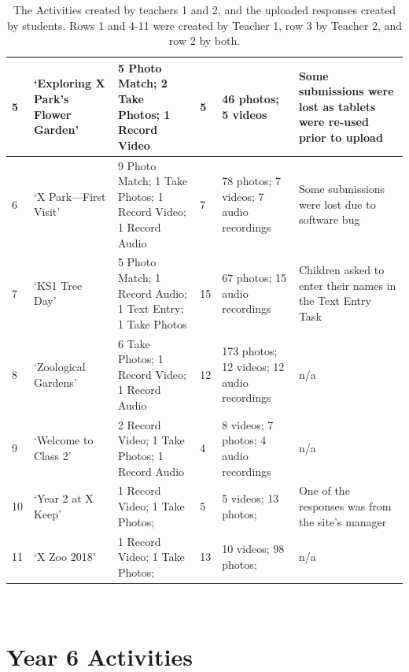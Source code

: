 \begin{table}[]
\begin{tabularx}{\linewidth}{ 
| p{4mm} 
| >{\raggedright\arraybackslash}X 
| >{\raggedright\arraybackslash}X 
| p{13mm}
| >{\raggedright\arraybackslash}X 
| >{\raggedright\arraybackslash}X 
|}
\hline
    \small 5 
    & \footnotesize `Exploring X Park's Flower Garden' 
    & \footnotesize 5 Photo Match; 2 Take Photos; 1 Record Video
    & \footnotesize 5 
    & \footnotesize 46 photos; 5 videos
    & \footnotesize Some submissions were lost as tablets were re-used prior to upload\\
\hline
    \small 6 
    & \footnotesize `X Park---First Visit' 
    & \footnotesize 9 Photo Match; 1 Take Photos; 1 Record Video; 1 Record Audio
    & \footnotesize 7 
    & \footnotesize 78 photos; 7 videos; 7 audio recordings
    & \footnotesize Some submissions were lost due to software bug\\
\hline
    \small 7 
    & \footnotesize `KS1 Tree Day' 
    & \footnotesize 5 Photo Match; 1 Record Audio; 1 Text Entry; 1 Take Photos
    & \footnotesize 15 
    & \footnotesize 67 photos; 15 audio recordings
    & \footnotesize Children asked to enter their names in the Text Entry Task\\
\hline
    \small 8 
    & \footnotesize `Zoological Gardens' 
    & \footnotesize 6 Take Photos; 1 Record Video; 1 Record Audio
    & \footnotesize 12 
    & \footnotesize 173 photos; 12 videos; 12 audio recordings
    & \footnotesize n/a\\
\hline
    \small 9 
    & \footnotesize `Welcome to Class 2' 
    & \footnotesize 2 Record Video; 1 Take Photos; 1 Record Audio
    & \footnotesize 4 
    & \footnotesize 8 videos; 7 photos; 4 audio recordings
    & \footnotesize n/a\\
\hline
    \small 10 
    & \footnotesize `Year 2 at X Keep' 
    & \footnotesize 1 Record Video; 1 Take Photos;
    & \footnotesize 5 
    & \footnotesize 5 videos; 13 photos;
    & \footnotesize One of the responses was from the site's manager\\
    \hline
    \small 11 
    & \footnotesize `X Zoo 2018' 
    & \footnotesize 1 Record Video; 1 Take Photos;
    & \footnotesize 13 
    & \footnotesize 10 videos; 98 photos;
    & \footnotesize n/a\\
\hline
\end{tabularx}
    \caption[The Activities created by teachers 1 and 2, and the uploaded responses created by students.]{The Activities created by teachers 1 and 2, and the uploaded responses created by students. Rows 1 and 4-11 were created by Teacher 1, row 3 by Teacher 2, and row 2 by both.}~\label{tab:TeacherActivities}
\end{table}

\section{Year 6 Activities}


